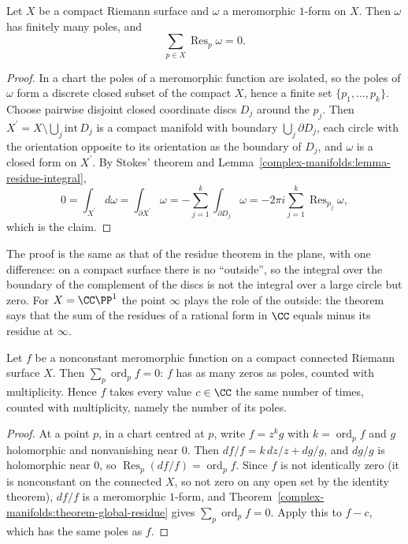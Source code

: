 \begin{theorem}\label{complex-manifolds:theorem-global-residue}
Let $X$ be a compact Riemann surface and $\omega$ a meromorphic $1$-form on $X$. Then $\omega$ has finitely many poles, and
\[
\sum_{p \in X}\operatorname{Res}_p\omega = 0 .
\]
\end{theorem}

\begin{proof}
In a chart the poles of a meromorphic function are isolated, so the poles of $\omega$ form a discrete closed subset of the compact $X$, hence a finite set $\{p_1, \ldots, p_k\}$. Choose pairwise
disjoint closed coordinate discs $D_j$ around the $p_j$. Then $X^{\prime} = X \setminus \bigcup_j\mathrm{int}\,D_j$ is a compact manifold with boundary $\bigcup_j\partial D_j$, each circle with the
orientation opposite to its orientation as the boundary of $D_j$, and $\omega$ is a closed form on $X^{\prime}$. By Stokes' theorem and Lemma~\ref{complex-manifolds:lemma-residue-integral},
\[
0 = \int_{X^{\prime}}d\omega = \int_{\partial X^{\prime}}\omega = -\sum_{j=1}^k\int_{\partial D_j}\omega = -2\pi i\sum_{j=1}^k\operatorname{Res}_{p_j}\omega,
\]
which is the claim.
\end{proof}

The proof is the same as that of the residue theorem in the plane, with one difference: on a compact surface there is no ``outside'', so the integral over the boundary of the complement of the
discs is not the integral over a large circle but zero. For $X = \CC\PP^1$ the point $\infty$ plays the role of the outside: the theorem says that the sum of the residues of a rational form in $\CC$
equals minus its residue at $\infty$.

\begin{corollary}\label{complex-manifolds:corollary-zeros-poles}
Let $f$ be a nonconstant meromorphic function on a compact connected Riemann surface $X$. Then $\sum_p\operatorname{ord}_pf = 0$: $f$ has as many zeros as poles, counted with multiplicity. Hence $f$
takes every value $c \in \CC$ the same number of times, counted with multiplicity, namely the number of its poles.
\end{corollary}

\begin{proof}
At a point $p$, in a chart centred at $p$, write $f = z^kg$ with $k = \operatorname{ord}_pf$ and $g$ holomorphic and nonvanishing near $0$. Then $df/f = k\,dz/z + dg/g$, and $dg/g$ is holomorphic near $0$,
so $\operatorname{Res}_p(df/f) = \operatorname{ord}_pf$. Since $f$ is not identically zero (it is nonconstant on the connected $X$, so not zero on any open set by the identity theorem), $df/f$ is a meromorphic
$1$-form, and Theorem~\ref{complex-manifolds:theorem-global-residue} gives $\sum_p\operatorname{ord}_pf = 0$. Apply this to $f - c$, which has the same poles as $f$.
\end{proof}

